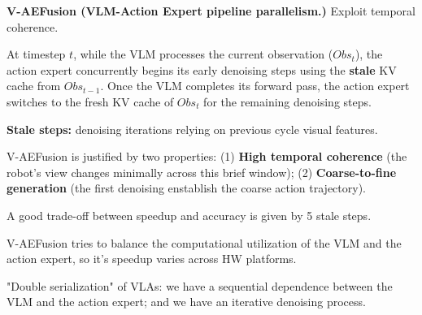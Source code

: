 \begin{dashlist}
    \item \textbf{V-AEFusion (VLM-Action Expert pipeline parallelism.)} Exploit temporal coherence.
    \begin{dashlist}
        \item At timestep $t$, while the VLM processes the current observation ($Obs_t$), the action expert concurrently begins its early denoising steps using the \textbf{stale} KV cache from $Obs_{t-1}$. Once the VLM completes its forward pass, the action expert switches to the fresh KV cache of $Obs_t$ for the remaining denoising steps.
        \item \textbf{Stale steps:} denoising iterations relying on previous cycle visual features.
        \item V-AEFusion is justified by two properties: (1) \textbf{High temporal coherence} (the robot's view changes minimally across this brief window); (2) \textbf{Coarse-to-fine generation} (the first denoising enstablish the coarse action trajectory).
        \item A good trade-off between speedup and accuracy is given by 5 stale steps.
        \item V-AEFusion tries to balance the computational utilization of the VLM and the action expert, so it's speedup varies across HW platforms.
    \end{dashlist}

    \item "Double serialization" of VLAs: we have a sequential dependence between the VLM and the action expert; and we have an iterative denoising process.
\end{dashlist}


